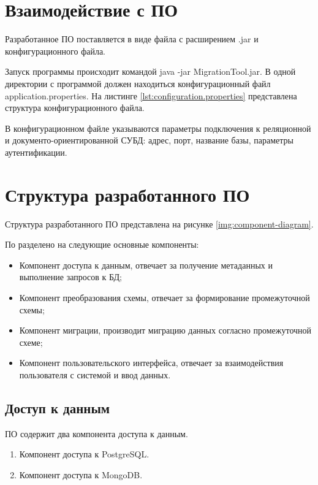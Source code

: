 \clearpage

\section{Взаимодействие с ПО}
Разработанное ПО поставляется в виде файла с расширением \textmd{.jar} и конфигурационного файла.

Запуск программы происходит командой \textmd{java -jar MigrationTool.jar}. 
В одной директории с программой должен находиться конфигурационный файл \textmd{application.properties}.
На листинге \ref{lst:configuration.properties} представлена структура конфигурационного файла.


В конфигурационном файле указываются параметры подключения к реляционной и документо-ориентированной СУБД:
адрес, порт, название базы, параметры аутентификации.


\clearpage
\section{Структура разработанного ПО}

Структура разработанного ПО представлена на рисунке \ref{img:component-diagram}.



По разделено на следующие основные компоненты:
\begin{itemize}[label=---]
    \item Компонент доступа к данным, отвечает за получение метаданных и выполнение запросов к БД;
    \item Компонент преобразования схемы, отвечает за формирование промежуточной схемы;
    \item Компонент миграции, производит миграцию данных согласно промежуточной схеме;
    \item Компонент пользовательского интерфейса, отвечает за взаимодействия пользователя с системой и ввод данных.
\end{itemize}

\clearpage

\subsection{Доступ к данным}

ПО содержит два компонента доступа к данным.
\begin{enumerate}
    \item Компонент доступа к PostgreSQL.
    \item Компонент доступа к MongoDB.
\end{enumerate}

